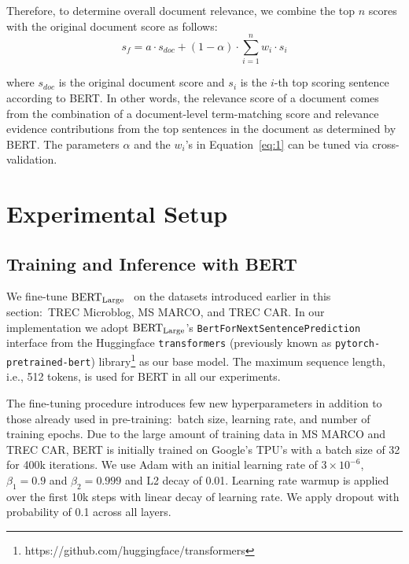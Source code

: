 Therefore, to determine overall document relevance, we combine the top $ n $ scores with the original document score as follows:
\begin{equation} \label{eq:1}
s_f = a \cdot s_{doc}  + (1 - \alpha) \cdot \sum_{i = 1}^n w_i \cdot s_i
\end{equation}

\noindent where $ s_{doc} $ is the original document score and $ s_i $ is the $ i $-th top scoring sentence according to BERT.
In other words, the relevance score of a document comes from the combination of a document-level term-matching score and relevance evidence contributions from the top sentences in the document as determined by BERT.
The parameters $ \alpha $ and the $ w_i $'s in Equation~\ref{eq:1} can be tuned via cross-validation.

\section{Experimental Setup}

\subsection{Training and Inference with BERT}

We fine-tune $ \textrm{BERT}_{\textrm{\scriptsize Large}} $~\cite{devlin2018bert} on the datasets introduced earlier in this section:\ TREC Microblog, MS MARCO, and TREC CAR.
In our implementation we adopt $ \textrm{BERT}_{\textrm{\scriptsize Large}} $'s \texttt{BertForNextSentencePrediction} interface from the Huggingface \texttt{transformers} (previously known as \texttt{pytorch-pretrained-bert}) library\footnote{https://github.com/huggingface/transformers} as our base model.
The maximum sequence length, i.e., 512 tokens, is used for BERT in all our experiments.

The fine-tuning procedure introduces few new hyperparameters in addition to those already used in pre-training:\ batch size, learning rate, and number of training epochs.
Due to the large amount of training data in MS MARCO and TREC CAR, BERT is initially trained on Google's TPU's with a batch size of 32 for 400k iterations.
We use Adam \cite{kingma2014adam} with an initial learning rate of $ 3 \times 10^{-6}$, $ \beta_1 = 0.9 $ and $ \beta_2 = 0.999 $ and L2 decay of 0.01.
Learning rate warmup is applied over the first 10k steps with linear decay of learning rate.
We apply dropout with probability of 0.1 across all layers.

